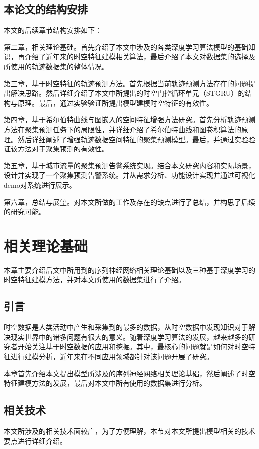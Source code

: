 \documentclass[master]{thesis-uestc}
\begin{document}
\section{本论文的结构安排}
本文的后续章节结构安排如下：

第二章，相关理论基础。首先介绍了本文中涉及的各类深度学习算法模型的基础知识，再介绍了近年来的时空特征建模相关算法，最后介绍了本文对数据集的选择及所使用的轨迹数据集的整体情况。

第三章，基于时空特征的轨迹预测方法。首先根据当前轨迹预测方法存在的问题提出解决思路。然后详细介绍了本文中所提出的时空门控循环单元（STGRU）的结构与原理。最后，通过实验验证所提出模型建模时空特征的有效性。

第四章，基于希尔伯特曲线与图嵌入的空间特征增强方法研究。首先分析轨迹预测方法在聚集预测任务下的局限性，并详细介绍了希尔伯特曲线和图卷积算法的原理。然后详细阐述了增强轨迹数据空间特征的聚集预测模型。最后，并通过实验验证该方法对于聚集预测的有效性。

第五章，基于城市流量的聚集预测告警系统实现。结合本文研究内容和实际场景，设计并实现了一个聚集预测告警系统。并从需求分析、功能设计实现并通过可视化demo对系统进行展示。

第六章，总结与展望。对本文所做的工作及存在的缺点进行了总结，并构思了后续的研究可能。

\chapter{相关理论基础}
本章主要介绍后文中所用到的序列神经网络相关理论基础以及三种基于深度学习的时空特征建模方法，并对本文所使用的数据集进行了介绍。

\section{引言}
时空数据是人类活动中产生和采集到的最多的数据，从时空数据中发现知识对于解决现实世界中的诸多问题有很大的意义。随着深度学习算法的发展，越来越多的研究者开始关注基于时空数据的应用和挖掘。其中，最核心的问题就是如何对时空特征进行建模分析，近年来在不同应用领域都针对该问题开展了研究。

本章首先介绍本文提出模型所涉及的序列神经网络相关理论基础，然后阐述了时空特征建模方法的发展，最后对本文中所有使用的数据集进行分析。

\section{相关技术}
本文所涉及的相关技术面较广，为了方便理解，本节对本文所提出模型相关的技术要点进行详细介绍。
\end{document}
